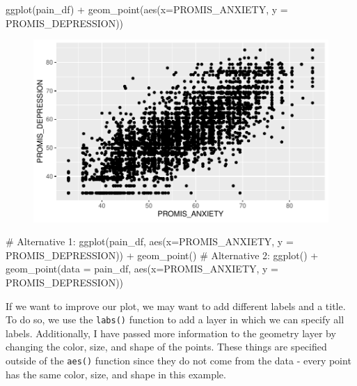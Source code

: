 \documentclass[
  letterpaper,
]{krantz}
\makeatletter
\newenvironment{Shaded}{\begin{snugshade}}{\end{snugshade}}
\newcommand{\AttributeTok}[1]{\textcolor[rgb]{0.40,0.45,0.13}{#1}}
\newcommand{\CommentTok}[1]{\textcolor[rgb]{0.37,0.37,0.37}{#1}}
\newcommand{\FunctionTok}[1]{\textcolor[rgb]{0.28,0.35,0.67}{#1}}
\newcommand{\NormalTok}[1]{\textcolor[rgb]{0.00,0.23,0.31}{#1}}
\newcommand{\SpecialCharTok}[1]{\textcolor[rgb]{0.37,0.37,0.37}{#1}}
\newenvironment{kframe}{%
\medskip{}
\setlength{\fboxsep}{.8em}
 \def\at@end@of@kframe{}%
 \ifinner\ifhmode%
  \def\at@end@of@kframe{\end{minipage}}%
  \begin{minipage}{\columnwidth}%
 \fi\fi%
 \def\FrameCommand##1{\hskip\@totalleftmargin \hskip-\fboxsep
 \colorbox{shadecolor}{##1}\hskip-\fboxsep
     \hskip-\linewidth \hskip-\@totalleftmargin \hskip\columnwidth}%
 \MakeFramed {\advance\hsize-\width
   \@totalleftmargin\z@ \linewidth\hsize
   \@setminipage}}%
 {\par\unskip\endMakeFramed%
 \at@end@of@kframe}
\renewenvironment{Shaded}{\begin{kframe}}{\end{kframe}}
\makeatother
\begin{document}
\begin{Shaded}
\begin{Highlighting}[]
\FunctionTok{ggplot}\NormalTok{(pain\_df) }\SpecialCharTok{+} \FunctionTok{geom\_point}\NormalTok{(}\FunctionTok{aes}\NormalTok{(}\AttributeTok{x=}\NormalTok{PROMIS\_ANXIETY, }\AttributeTok{y =}\NormalTok{ PROMIS\_DEPRESSION))}
\end{Highlighting}
\end{Shaded}

\begin{figure}[H]

{\centering \includegraphics[width=1\textwidth,height=\textheight]{book/7_visualization_ggplot_files/figure-pdf/unnamed-chunk-3-1.pdf}

}

\end{figure}

\begin{Shaded}
\begin{Highlighting}[]
\CommentTok{\# Alternative 1:}
\FunctionTok{ggplot}\NormalTok{(pain\_df, }\FunctionTok{aes}\NormalTok{(}\AttributeTok{x=}\NormalTok{PROMIS\_ANXIETY, }\AttributeTok{y =}\NormalTok{ PROMIS\_DEPRESSION)) }\SpecialCharTok{+} \FunctionTok{geom\_point}\NormalTok{()}
\CommentTok{\# Alternative 2:}
\FunctionTok{ggplot}\NormalTok{() }\SpecialCharTok{+} \FunctionTok{geom\_point}\NormalTok{(}\AttributeTok{data =}\NormalTok{ pain\_df, }\FunctionTok{aes}\NormalTok{(}\AttributeTok{x=}\NormalTok{PROMIS\_ANXIETY, }
                                          \AttributeTok{y =}\NormalTok{ PROMIS\_DEPRESSION))}
\end{Highlighting}
\end{Shaded}

If we want to improve our plot, we may want to add different labels and
a title. To do so, we use the \texttt{labs()} function to add a layer in
which we can specify all labels. Additionally, I have passed more
information to the geometry layer by changing the color, size, and shape
of the points. These things are specified outside of the \texttt{aes()}
function since they do not come from the data - every point has the same
color, size, and shape in this example.
\end{document}
